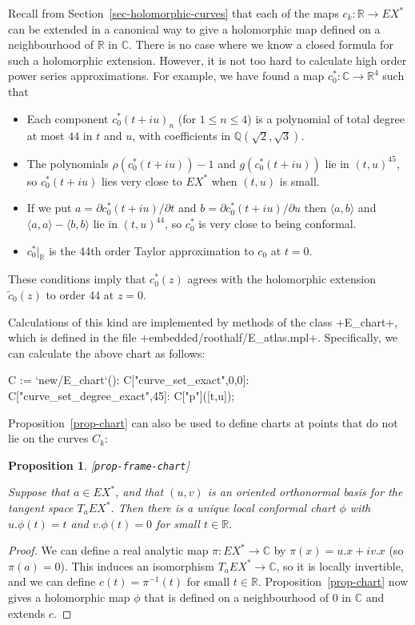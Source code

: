 \documentclass[reqno]{amsart}
\newcommand{\lbl}[1]{\label{#1}\textup{[\texttt{#1}]}\par}
\newcommand{\lbl}{\label}
\newcommand{\Q}         {{\mathbb{Q}}}
\newcommand{\R}         {{\mathbb{R}}}
\newcommand{\C}         {{\mathbb{C}}}
\newcommand{\ip}[1]     {\langle #1\rangle}
\newcommand{\rt}        {\sqrt{2}}
\newcommand{\tc}	{\widetilde{c}}
\renewcommand{\:}{\colon}
\newtheorem{proposition}[theorem]{Proposition}
\theoremstyle{definition}
\begin{document}
Recall from Section~\ref{sec-holomorphic-curves} that each of
the maps $c_k\:\R\to EX^*$ can be extended in a canonical way to give
a holomorphic map defined on a neighbourhood of $\R$ in $\C$.  There
is no case where we know a closed formula for such a holomorphic
extension.  However, it is not too hard to calculate high order power
series approximations.  For example, we have found a map
$c_0^*\:\C\to\R^4$ such that
\begin{itemize}
 \item Each component $c_0^*(t+iu)_n$ (for $1\leq n\leq 4$) is a
  polynomial of total degree at most $44$ in $t$ and $u$, with
  coefficients in $\Q(\rt,\sqrt{3})$.
 \item The polynomials $\rho(c_0^*(t+iu))-1$ and $g(c_0^*(t+iu))$ lie
  in $(t,u)^{45}$, so $c_0^*(t+iu)$ lies very close to $EX^*$ when
  $(t,u)$ is small.
 \item If we put $a=\partial c_0^*(t+iu)/\partial t$ and
  $b=\partial c_0^*(t+iu)/\partial u$ then $\ip{a,b}$ and
  $\ip{a,a}-\ip{b,b}$ lie in $(t,u)^{44}$, so $c_0^*$ is very close to
  being conformal.
 \item $c^*_0|_{\R}$ is the 44th order Taylor approximation to $c_0$
  at $t=0$.
\end{itemize}
These conditions imply that $c^*_0(z)$ agrees with the holomorphic
extension $\tc_0(z)$ to order 44 at $z=0$.

Calculations of this kind are implemented by methods of the class
\mcode+E_chart+, which is defined in the file
\fname+embedded/roothalf/E_atlas.mpl+.  Specifically, we can
calculate the above chart as follows:
\begin{mcodeblock}
   C := `new/E_chart`():
   C["curve_set_exact",0,0]:
   C["curve_set_degree_exact",45]:
   C["p"]([t,u]);
\end{mcodeblock}

Proposition~\ref{prop-chart} can also be used to define charts at
points that do not lie on the curves $C_k$:
\begin{proposition}\lbl{prop-frame-chart}
 Suppose that $a\in EX^*$, and that $(u,v)$ is an oriented orthonormal
 basis for the tangent space $T_aEX^*$.  Then there is a unique local
 conformal chart $\phi$ with $u.\phi(t)=t$ and $v.\phi(t)=0$ for
 small $t\in\R$.
\end{proposition}
\begin{proof}
 We can define a real analytic map $\pi\:EX^*\to\C$ by
 $\pi(x)=u.x+iv.x$ (so $\pi(a)=0$).  This induces an isomorphism
 $T_aEX^*\to\C$, so it is locally invertible, and we can define
 $c(t)=\pi^{-1}(t)$ for small $t\in\R$.  Proposition~\ref{prop-chart}
 now gives a holomorphic map $\phi$ that is defined on a neighbourhood
 of $0$ in $\C$ and extends $c$.
\end{proof}
\end{document}

